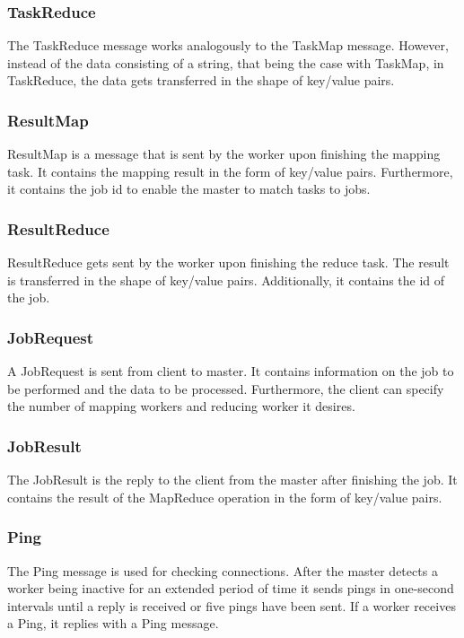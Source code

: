 \documentclass[12pt, letterpaper]{article}
\begin{document}
\subsubsection{TaskReduce}
The TaskReduce message works analogously to the TaskMap message. However, instead of the data consisting of a string, that being the case with TaskMap, in TaskReduce, the data gets transferred in the shape of key/value pairs. 

\subsubsection{ResultMap}
ResultMap is a message that is sent by the worker upon finishing the mapping task. It contains the mapping result in the form of key/value pairs. Furthermore, it contains the job id to enable the master to match tasks to jobs.

\subsubsection{ResultReduce}
ResultReduce gets sent by the worker upon finishing the reduce task. The result is transferred in the shape of key/value pairs. Additionally, it contains the id of the job. 

\subsubsection{JobRequest}
A JobRequest is sent from client to master. It contains information on the job to be performed and the data to be processed. Furthermore, the client can specify the number of mapping workers and reducing worker it desires. 

\subsubsection{JobResult}
The JobResult is the reply to the client from the master after finishing the job. It contains the result of the MapReduce operation in the form of key/value pairs.  

\subsubsection{Ping}
The Ping message is used for checking connections. After the master detects a worker being inactive for an extended period of time it sends pings in one-second intervals until a reply is received or five pings have been sent. If a worker receives a Ping, it replies with a Ping message.
\end{document}
